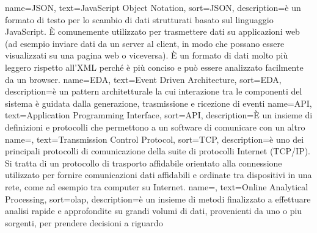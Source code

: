 {
    name={JSON},
    text=JavaScript Object Notation,
    sort=JSON,
    description={è un formato di testo per lo scambio di dati strutturati basato sul linguaggio JavaScript. È comunemente utilizzato per trasmettere dati su applicazioni web (ad esempio inviare dati da un server al client, in modo che possano essere visualizzati su una pagina web o viceversa). È un formato di dati molto più leggero rispetto all'XML perché è più conciso e può essere analizzato facilmente da un browser.}
}
{
    name={EDA},
    text=Event Driven Architecture,
    sort=EDA,
    description={è un pattern architetturale la cui interazione tra le componenti del sistema è guidata dalla generazione, trasmissione e ricezione di eventi}
}
{
    name={API},
    text=Application Programming Interface,
    sort=API,
    description={È un insieme di definizioni e protocolli che permettono a un software di comunicare con un altro}
}
 {
    name=,
    text=Transmission Control Protocol,
    sort=TCP,
    description={è uno dei principali protocolli di comunicazione della suite di protocolli Internet (TCP/IP). Si tratta di un protocollo di trasporto affidabile orientato alla connessione utilizzato per fornire comunicazioni dati affidabili e ordinate tra dispositivi in una rete, come ad esempio tra computer su Internet.}
}
 {
    name=,
    text=Online Analytical Processing,
    sort=olap,
    description={è un insieme di metodi finalizzato a effettuare analisi rapide e approfondite su grandi volumi di dati, provenienti da uno o piu sorgenti, per prendere decisioni a riguardo}
}
